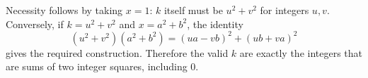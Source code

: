 Necessity follows by taking $x=1$: $k$ itself must be $u^2+v^2$ for integers $u,v$. Conversely, if $k=u^2+v^2$ and $x=a^2+b^2$, the identity\[(u^2+v^2)(a^2+b^2)=(ua-vb)^2+(ub+va)^2\]gives the required construction. Therefore the valid $k$ are exactly the integers that are sums of two integer squares, including $0$.
